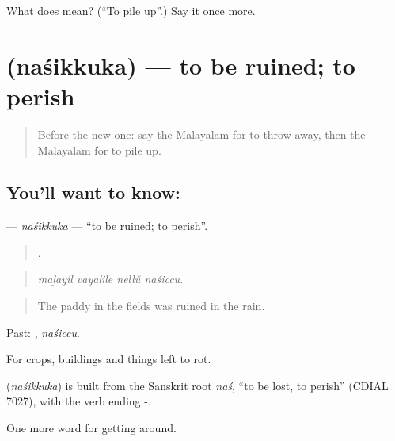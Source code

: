 \begin{tcolorbox}[breakable,colback=teal!4,colframe=teal!35!black,title={Before you move on}]
What does  mean? (\textquotedblleft{}To pile up\textquotedblright{}.) Say it once more.
\end{tcolorbox}
\section[\texorpdfstring{\ml{നശിക്കുക} (naśikkuka)}{നശിക്കുക (naśikkuka)}]{ (naśikkuka) — to be ruined; to perish}

\label{lesson:ML-C504-nasikkuka}



\begin{quote}
Before the new one: say the Malayalam for to throw away, then the Malayalam for to pile up.
\end{quote}

\subsection*{You'll want to know: }
\textbf{} — \emph{naśikkuka} — \textquotedblleft{}to be ruined; to perish\textquotedblright{}.

\begin{quote}
   .
\end{quote}

\begin{quote}
\emph{maḻayil vayalile nellŭ naśiccu.}
\end{quote}

\begin{quote}
The paddy in the fields was ruined in the rain.
\end{quote}

Past: , \emph{naśiccu}.

For crops, buildings and things left to rot.

\begin{cousinweb}
\textbf{} (\emph{naśikkuka}) is built from the Sanskrit root \emph{naś}, \textquotedblleft{}to be lost, to perish\textquotedblright{} (CDIAL 7027), with the verb ending -.
\end{cousinweb}

\begin{grammarlens}[title={What you've built}]
One more word for getting around.
\end{grammarlens}


